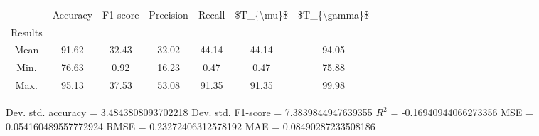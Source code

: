 \begin{tabular}{|c|c|c|c|c|c|c|}
\toprule
{} &  Accuracy &  F1 score &  Precision &  Recall &  \$T\_\{\textbackslash mu\}\$ &  \$T\_\{\textbackslash gamma\}\$ \\
Results &           &           &            &         &            &               \\
\hline
Mean    &     91.62 &     32.43 &      32.02 &   44.14 &      44.14 &         94.05 \\
Min.    &     76.63 &      0.92 &      16.23 &    0.47 &       0.47 &         75.88 \\
Max.    &     95.13 &     37.53 &      53.08 &   91.35 &      91.35 &         99.98 \\
\bottomrule
\end{tabular}

 Dev. std. accuracy = 3.4843808093702218
 Dev. std. F1-score = 7.3839844947639355
 $R^2$ = -0.16940944066273356
 MSE = 0.054160489557772924
 RMSE = 0.23272406312578192
 MAE = 0.08490287233508186